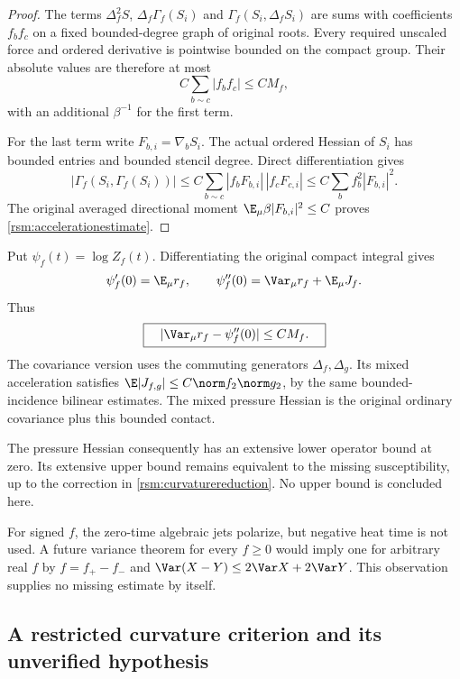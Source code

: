 \begin{proof}
The terms \(\Delta_f^2S\), \(\Delta_f\Gamma_f(S_i)\) and
\(\Gamma_f(S_i,\Delta_fS_i)\) are sums with coefficients \(f_bf_c\) on a fixed bounded-degree graph of original roots. Every required unscaled force and ordered derivative is pointwise bounded on the compact group. Their absolute values are therefore at most
\[
 C\sum_{b\sim c}|f_bf_c|\le CM_f,
\]
with an additional \(\beta^{-1}\) for the first term.

For the last term write \(F_{b,i}=\nabla_bS_i\). The actual ordered Hessian of \(S_i\) has bounded entries and bounded stencil degree. Direct differentiation gives
\[
 |\Gamma_f(S_i,\Gamma_f(S_i))|
 \le C\sum_{b\sim c}|f_bF_{b,i}|\,
                             |f_cF_{c,i}|
 \le C\sum_b f_b^2|F_{b,i}|^2.
\]
The original averaged directional moment
\(\E_\mu\beta|F_{b,i}|^2\le C\) proves
\eqref{rsm:accelerationestimate}.
\end{proof}

Put \(\psi_f(t)=\log Z_f(t)\). Differentiating the original compact integral gives
\begin{equation}
 \psi_f'(0)=\E_\mu r_f,\qquad
 \psi_f''(0)=\Var_\mu r_f+\E_\mu J_f.
 \label{rsm:pressurecurvature}
\end{equation}
Thus
\begin{equation}
 \boxed{\quad
 |\Var_\mu r_f-\psi_f''(0)|\le CM_f.
 \quad}
 \label{rsm:curvaturereduction}
\end{equation}
The covariance version uses the commuting generators \(\Delta_f,\Delta_g\). Its mixed acceleration satisfies
\(\E|J_{f,g}|\le C\norm f_2\norm g_2\), by the same bounded-incidence bilinear estimates. The mixed pressure Hessian is the original ordinary covariance plus this bounded contact.

The pressure Hessian consequently has an extensive lower operator bound at zero. Its extensive upper bound remains equivalent to the missing susceptibility, up to the correction in \eqref{rsm:curvaturereduction}. No upper bound is concluded here.

For signed \(f\), the zero-time algebraic jets polarize, but negative heat time is not used. A future variance theorem for every \(f\ge0\) would imply one for arbitrary real \(f\) by \(f=f_+-f_-\) and
\(\Var(X-Y)\le2\Var X+2\Var Y\). This observation supplies no missing estimate by itself.

\subsection{A restricted curvature criterion and its unverified hypothesis}
\label{rsm:curvaturecriterionsection}

